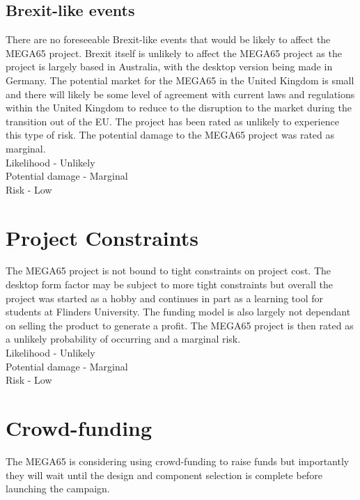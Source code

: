 \subsection{Brexit-like events}
There are no foreseeable Brexit-like events that would be likely to affect the MEGA65 project. Brexit itself is unlikely to affect the MEGA65 project as the project is largely based in Australia, with the desktop version being made in Germany. The potential market for the MEGA65 in the United Kingdom is small and there will likely be some level of agreement with current laws and regulations within the United Kingdom to reduce to the disruption to the market during the transition out of the EU. The project has been rated as unlikely to experience this type of risk. The potential damage to the MEGA65 project was rated as marginal. \\

Likelihood - Unlikely \\
Potential damage - Marginal \\
Risk - Low \\


\section{Project Constraints}
The MEGA65 project is not bound to tight constraints on project cost. The desktop form factor may be subject to more tight constraints but overall the project was started as a hobby and continues in part as a learning tool for students at Flinders University. The funding model is also largely not dependant on selling the product to generate a profit. The MEGA65 project is then rated as a unlikely probability of occurring and a marginal risk. \\

Likelihood - Unlikely \\
Potential damage - Marginal \\
Risk - Low \\


\section{Crowd-funding}
The MEGA65 is considering using crowd-funding to raise funds but importantly they will wait until the design and component selection is complete before launching the campaign.


